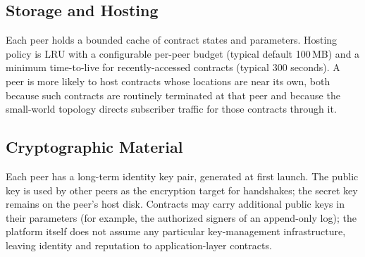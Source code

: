 \subsection{Storage and Hosting}

Each peer holds a bounded cache of contract states and parameters. Hosting policy is LRU with a configurable per-peer budget (typical default 100\,MB) and a minimum time-to-live for recently-accessed contracts (typical 300 seconds). A peer is more likely to host contracts whose locations are near its own, both because such contracts are routinely terminated at that peer and because the small-world topology directs subscriber traffic for those contracts through it.

\subsection{Cryptographic Material}

Each peer has a long-term identity key pair, generated at first launch. The public key is used by other peers as the encryption target for handshakes; the secret key remains on the peer's host disk. Contracts may carry additional public keys in their parameters (for example, the authorized signers of an append-only log); the platform itself does not assume any particular key-management infrastructure, leaving identity and reputation to application-layer contracts.
